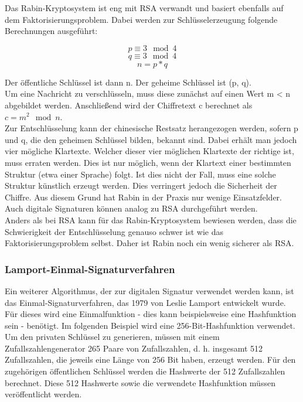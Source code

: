 			Das Rabin-Kryptosystem ist eng mit RSA verwandt und basiert ebenfalls auf dem Faktorisierungsproblem. Dabei werden zur Schlüsselerzeugung folgende Berechnungen ausgeführt:
			
			\[ p\equiv3 \mod{4} \]
			\[ q\equiv3 \mod{4} \]
			\[ n=p*q \]
			
			Der öffentliche Schlüssel ist dann n. Der geheime Schlüssel ist (p, q).\\
			
			Um eine Nachricht zu verschlüsseln, muss diese zunächst auf einen Wert m < n abgebildet werden. Anschließend wird der Chiffretext c berechnet als $c=m^{2} \mod{n}$.\\
			
			Zur Entschlüsselung kann der chinesische Restsatz herangezogen werden, sofern p und q, die den geheimen Schlüssel bilden, bekannt sind. Dabei erhält man jedoch vier mögliche Klartexte. Welcher dieser vier möglichen Klartexte der richtige ist, muss erraten werden. Dies ist nur möglich, wenn der Klartext einer bestimmten Struktur (etwa einer Sprache) folgt. Ist dies nicht der Fall, muss eine solche Struktur künstlich erzeugt werden. Dies verringert jedoch die Sicherheit der Chiffre. Aus diesem Grund hat Rabin in der Praxis nur wenige Einsatzfelder.\\
			
			Auch digitale Signaturen können analog zu RSA durchgeführt werden.\\
			
			Anders als bei RSA kann für das Rabin-Kryptosystem bewiesen werden, dass die Schwierigkeit der Entschlüsselung genauso schwer ist wie das Faktorisierungsproblem selbst. Daher ist Rabin noch ein wenig sicherer als RSA.
			
			\subsubsection{Lamport-Einmal-Signaturverfahren}
			\label{subsubsec:grundlagen:krypto:auth:lamport}
			
			Ein weiterer Algorithmus, der zur digitalen Signatur verwendet werden kann, ist das Einmal-Signaturverfahren, das 1979 von Leslie Lamport entwickelt wurde. Für dieses wird eine Einmalfunktion - dies kann beispielsweise eine Hashfunktion sein - benötigt. Im folgenden Beispiel wird eine 256-Bit-Hashfunktion verwendet.\\
			
			Um den privaten Schlüssel zu generieren, müssen mit einem Zufallszahlengenerator 265 Paare von Zufallszahlen, d. h. insgesamt 512 Zufallszahlen, die jeweils eine Länge von 256 Bit haben, erzeugt werden. Für den zugehörigen öffentlichen Schlüssel werden die Hashwerte der 512 Zufallszahlen berechnet. Diese 512 Hashwerte sowie die verwendete Hashfunktion müssen veröffentlicht werden.\\
			
